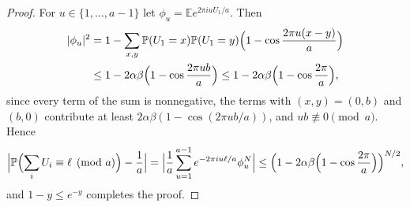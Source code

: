 \documentclass[11pt]{amsart}
\theoremstyle{definition}
\theoremstyle{remark}
\numberwithin{equation}{section}
\newcommand{\Pp}{\mathbb P}
\newcommand{\E}{\mathbb E}
\begin{document}
\begin{proof}
For $u\in\{1,\dots,a-1\}$ let $\phi_u=\E e^{2\pi iuU_1/a}$. Then
\begin{align*}
|\phi_u|^2&=1-\sum_{x,y}\Pp(U_1=x)\Pp(U_1=y)\Bigl(1-\cos\frac{2\pi u(x-y)}a\Bigr)\\
&\le1-2\alpha\beta\Bigl(1-\cos\frac{2\pi ub}a\Bigr)\le1-2\alpha\beta\Bigl(1-\cos\frac{2\pi}a\Bigr),
\end{align*}
since every term of the sum is nonnegative, the terms with $(x,y)=(0,b)$ and $(b,0)$ contribute at least $2\alpha\beta(1-\cos(2\pi ub/a))$, and $ub\not\equiv0\pmod a$. Hence
\[
\Bigl|\Pp\Bigl(\sum_iU_i\equiv\ell\pmod a\Bigr)-\frac1a\Bigr|=\Bigl|\frac1a\sum_{u=1}^{a-1}e^{-2\pi iu\ell/a}\phi_u^N\Bigr|\le\Bigl(1-2\alpha\beta\Bigl(1-\cos\frac{2\pi}a\Bigr)\Bigr)^{N/2},
\]
and $1-y\le e^{-y}$ completes the proof.
\end{proof}
\end{document}
